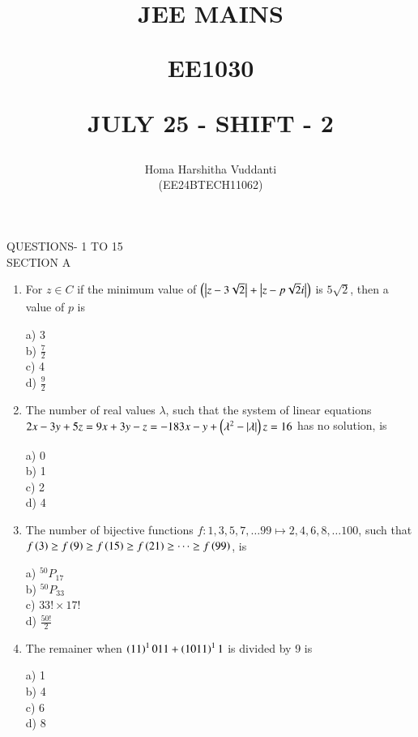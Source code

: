\documentclass[journal]{IEEEtran}
\begin{document}


\title{
JEE MAINS

\large{EE1030}

JULY 25 - SHIFT - 2
}
\author{Homa Harshitha Vuddanti

(EE24BTECH11062)
}	

\maketitle

\bigskip

\renewcommand{\thefigure}{\theenumi}
\renewcommand{\thetable}{\theenumi}
QUESTIONS- 1 TO 15\\
SECTION A
\begin{enumerate}
   
\item For $z\in C$ if the minimum value of $\left(\left\vert z-3\sqrt{2}\right\vert+\left\vert z-p\sqrt{2}i\right\vert\right)$ is $5\sqrt{2}$, then a value of $p$ is
\begin{multicols}{4}
    a) 3\\
    b) $\frac{7}{2}$\\
    c) 4\\
    d) $\frac{9}{2}$
\end{multicols}
 \item The number of real values $\lambda$, such that the system of linear equations $2x-3y+5z=9\\
 x+3y-z=-18\\
 3x-y+\left(\lambda^2 - \left\vert\lambda\right\vert\right)z=16$ has no solution, is 
 \begin{multicols}{4}
     a) 0\\
     b) 1\\
     c) 2\\
     d) 4
 \end{multicols}
 
 \item The number of bijective functions $f:{1,3,5,7,\dots 99}\mapsto {2,4,6,8,\dots 100}$, such that $f\left(3\right)\geq f\left(9\right)\geq f\left(15\right)\geq f\left(21\right)\geq \dots \geq f\left(99\right)$, is
 \begin{multicols}{4}
    a) $^{50} P_{17}$\\
    b) $^{50} P_{33}$\\
    c) $33! \times 17!$\\
    d) $\frac{50!}{2}$
 \end{multicols}
 
\item The remainer when $\left(11\right)^1011+\left(1011\right)^11$ is divided by 9 is
\begin{multicols}{4}
    a) 1\\
    b) 4\\
    c) 6\\
    d) 8
\end{multicols}


\end{enumerate}
\end{document}
